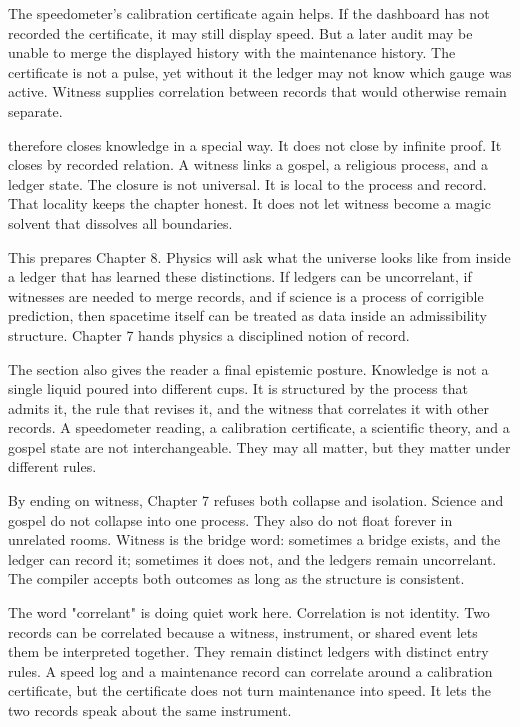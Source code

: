 The speedometer's calibration certificate again helps. If the dashboard has not
recorded the certificate, it may still display speed. But a later audit may be
unable to merge the displayed history with the maintenance history. The
certificate is not a pulse, yet without it the ledger may not know which gauge
was active. Witness supplies correlation between records that would otherwise
remain separate.

 therefore closes knowledge in a special way. It does not close
by infinite proof. It closes by recorded relation. A witness links a gospel, a
religious process, and a ledger state. The closure is not universal. It is
local to the process and record. That locality keeps the chapter honest. It
does not let witness become a magic solvent that dissolves all boundaries.

This prepares Chapter 8. Physics will ask what the universe looks like from
inside a ledger that has learned these distinctions. If ledgers can be
uncorrelant, if witnesses are needed to merge records, and if science is a
process of corrigible prediction, then spacetime itself can be treated as data
inside an admissibility structure. Chapter 7 hands physics a disciplined notion
of record.

The section also gives the reader a final epistemic posture. Knowledge is not a
single liquid poured into different cups. It is structured by the process that
admits it, the rule that revises it, and the witness that correlates it with
other records. A speedometer reading, a calibration certificate, a scientific
theory, and a gospel state are not interchangeable. They may all matter, but
they matter under different rules.

By ending on witness, Chapter 7 refuses both collapse and isolation. Science
and gospel do not collapse into one process. They also do not float forever in
unrelated rooms. Witness is the bridge word: sometimes a bridge exists, and the
ledger can record it; sometimes it does not, and the ledgers remain
uncorrelant. The compiler accepts both outcomes as long as the structure is
consistent.

The word "correlant" is doing quiet work here. Correlation is not identity. Two
records can be correlated because a witness, instrument, or shared event lets
them be interpreted together. They remain distinct ledgers with distinct entry
rules. A speed log and a maintenance record can correlate around a calibration
certificate, but the certificate does not turn maintenance into speed. It lets
the two records speak about the same instrument.

